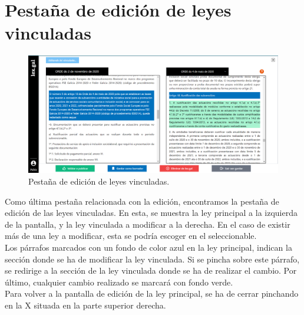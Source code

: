 \section{Pestaña de edición de leyes vinculadas}
\label{PEdicionLeyVinculada}

\begin{figure}[H]
\centerline{\includegraphics[width=15cm]{figuras/manualUsuario/PestanaLeyVinculada.PNG}}
\caption{Pestaña de edición de leyes vinculadas.}
\label{enlacePLeyVinculada}
\end{figure}

Como última pestaña relacionada con la edición, encontramos la pestaña de edición de las leyes vinculadas. En esta, se muestra la ley principal a la izquierda de la pantalla, y la ley vinculada a modificar a la derecha. En el caso de existir más de una ley a modificar, esta se podría escoger en el seleccionable.
\\

Los párrafos marcados con un fondo de color azul en la ley principal, indican la sección donde se ha de modificar la ley vinculada. Si se pincha sobre este párrafo, se redirige a la sección de la ley vinculada donde se ha de realizar el cambio. Por último, cualquier cambio realizado se marcará con fondo verde. 
\\

Para volver a la pantalla de edición de la ley principal, se ha de cerrar pinchando en la X situada en la parte superior derecha.